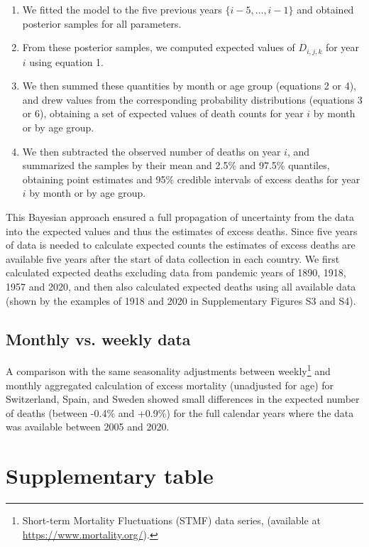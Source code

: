 \documentclass{article}
\begin{document}
	\begin{enumerate}
		\item We fitted the model to the five previous years $\{i-5,\ldots,i-1\}$ and obtained posterior samples for all parameters.
		\item From these posterior samples, we computed expected values of $D_{i,j,k}$ for year $i$ using equation 1.
		\item We then summed these quantities by month or age group (equations 2 or 4), and drew values from the corresponding probability distributions (equations 3 or 6), obtaining a set of expected values of death counts for year $i$ by month or by age group. 
		\item We then subtracted the observed number of deaths on year $i$, and summarized the samples by their mean and 2.5\% and 97.5\% quantiles, obtaining point estimates and 95\% credible intervals of excess deaths for year $i$ by month or by age group. 
	\end{enumerate} 
	
	This Bayesian approach ensured a full propagation of uncertainty from the data into the expected values and thus the estimates of excess deaths.
	Since five years of data is needed to calculate expected counts the estimates of excess deaths are available five years after the start of data collection in each country. We first calculated expected deaths excluding data from pandemic years of 1890, 1918, 1957 and 2020, and then also calculated expected deaths using all available data (shown by the examples of 1918 and 2020 in Supplementary Figures S3 and S4).

	\subsection{Monthly vs. weekly data}
	
	A comparison with the same seasonality adjustments between weekly\footnote{Short-term Mortality Fluctuations (STMF) data series, (available at \url{https://www.mortality.org/}).} and monthly aggregated calculation of excess mortality (unadjusted for age) for Switzerland, Spain, and Sweden showed small differences in the expected number of deaths (between -0.4\% and +0.9\%) for the full calendar years where the data was available between 2005 and 2020.	

	\section{Supplementary table}
	
\end{document}
